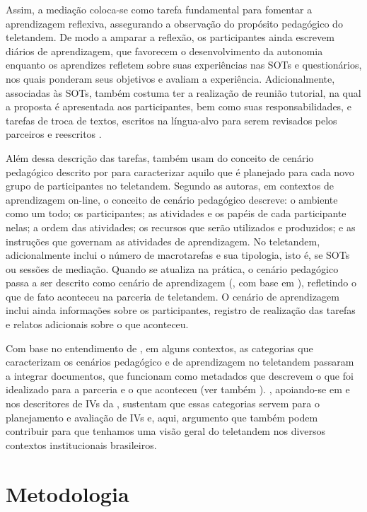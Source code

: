 \documentclass[portuguese]{textolivre}
\begin{document}
Assim, a mediação coloca-se como tarefa fundamental para fomentar a aprendizagem reflexiva, assegurando a observação do propósito pedagógico do teletandem. De modo a amparar a reflexão, os participantes ainda escrevem diários de aprendizagem, que favorecem o desenvolvimento da autonomia enquanto os aprendizes refletem sobre suas experiências nas SOTs e questionários, nos quais ponderam seus objetivos e avaliam a experiência. Adicionalmente, associadas às SOTs, também costuma ter a realização de reunião tutorial, na qual a proposta é apresentada aos participantes, bem como suas responsabilidades, e tarefas de troca de textos, escritos na língua-alvo para serem revisados pelos parceiros e reescritos \cite{aranha2014}.

Além dessa descrição das tarefas, \textcite{aranha2017} também usam do conceito de cenário pedagógico descrito por \textcite{chanier2016} para caracterizar aquilo que é planejado para cada novo grupo de participantes no teletandem. Segundo as autoras, em contextos de aprendizagem on-line, o conceito de cenário pedagógico descreve: o ambiente como um todo; os participantes; as atividades e os papéis de cada participante nelas; a ordem das atividades; os recursos que serão utilizados e produzidos; e as instruções que governam as atividades de aprendizagem. No teletandem, adicionalmente inclui o número de macrotarefas e sua tipologia, isto é, se SOTs ou sessões de mediação. Quando se atualiza na prática, o cenário pedagógico passa a ser descrito como cenário de aprendizagem (\textcite{aranha2017}, com base em \textcite{foucher2010}), refletindo o que de fato aconteceu na parceria de teletandem. O cenário de aprendizagem inclui ainda informações sobre os participantes, registro de realização das tarefas e relatos adicionais sobre o que aconteceu.

Com base no entendimento de \textcite{aranha2017}, em alguns contextos, as categorias que caracterizam os cenários pedagógico e de aprendizagem no teletandem passaram a integrar documentos, que funcionam como metadados que descrevem o que foi idealizado para a parceria e o que aconteceu (ver também \textcite{lopes2019}). \textcite{rampazzamoore2024b}, apoiando-se em \textcite{aranha2017} e nos descritores de IVs da \textcite{stevens2021}, sustentam que essas categorias servem para o planejamento e avaliação de IVs e, aqui, argumento que também podem contribuir para que tenhamos uma visão geral do teletandem nos diversos contextos institucionais brasileiros.


\section{Metodologia}\label{metodologia}
\end{document}
